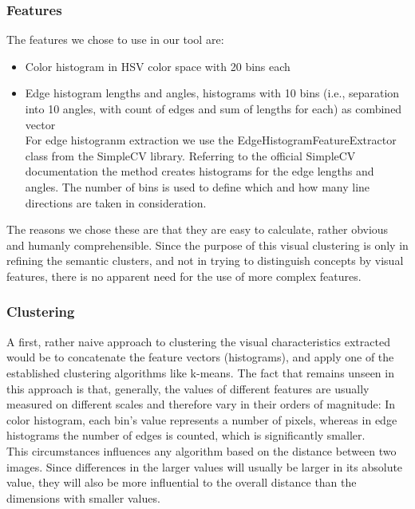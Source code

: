 \subsubsection{Features}
The features we chose to use in our tool are:
\begin{itemize}
\item{Color histogram} in HSV color space with 20 bins each
\item{Edge histogram} lengths and angles, histograms with 10 bins (i.e., separation into 10 angles, with count of edges and sum of lengths for each) as combined vector 
\\
For edge histogranm extraction we use the EdgeHistogramFeatureExtractor class from the SimpleCV library. Referring to the official SimpleCV documentation   the method creates histograms for the edge lengths and angles. The number of bins is used to define which and how many line directions are taken in consideration.  
\end{itemize}
The reasons we chose these are that they are easy to calculate, rather obvious and humanly comprehensible. Since the purpose of this visual clustering is only in refining the semantic clusters, and not in trying to distinguish concepts by visual features, there is no apparent need for the use of more complex features. \\


\subsubsection{Clustering}
A first, rather naive approach to clustering the visual characteristics extracted would be to concatenate the feature vectors (histograms), and apply one of the established clustering algorithms like k-means.  The fact that remains unseen in this approach is that, generally, the values of different features are usually measured on different scales and therefore vary in their orders of magnitude: In color histogram, each bin's value represents a number of pixels, whereas in edge histograms the number of edges is counted, which is significantly smaller. \\
This circumstances influences any algorithm based on the distance between two images. Since differences in the larger values will usually be larger in its absolute value, they will also be more influential to the overall distance than the dimensions with smaller values.

